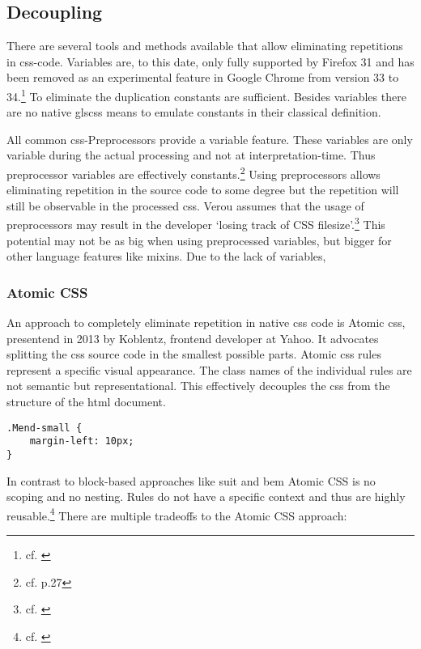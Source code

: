 \subsection{Decoupling}
There are several tools and methods available that allow eliminating repetitions in \gls{css}-code.
Variables are, to this date, only fully supported by Firefox 31 and has been removed as an experimental feature in Google Chrome from version 33 to 34.\footnote{cf. \cite{cssvariables}}
To eliminate the duplication constants are sufficient.
Besides variables there are no native gls{css} means to emulate constants in their classical definition.

All common \gls{css}-Preprocessors provide a variable feature.
These variables are only variable during the actual processing and not at interpretation-time.
Thus preprocessor variables are effectively constants.\footnote{cf. \cite{wirthpreprocessors} p.27}
Using preprocessors allows eliminating repetition in the source code to some degree
but the repetition will still be observable in the processed \gls{css}.
Verou assumes that the usage of preprocessors may result in the developer `losing track of CSS filesize'.\footnote{cf. \cite{veroupreprocessors}}
This potential may not be as big when using preprocessed variables, but bigger for other language features like mixins.
Due to the lack of variables, 

\subsubsection*{Atomic CSS}
An approach to completely eliminate repetition in native \gls{css} code is Atomic \gls{css}, presentend in 2013 by Koblentz, frontend developer at Yahoo.
It advocates splitting the \gls{css} source code in the smallest possible parts.
Atomic \gls{css} rules represent a specific visual appearance.
The class names of the individual rules are not semantic but representational.
This effectively decouples the \gls{css} from the structure of the \gls{html} document.


\begin{lstlisting}
.Mend-small {
    margin-left: 10px;
}
\end{lstlisting}

In contrast to block-based approaches like \gls{suit} and \gls{bem} Atomic CSS is no scoping and no nesting.
Rules do not have a specific context and thus are highly reusable.\footnote{cf. \cite{atomiccssarticle}}
There are multiple tradeoffs to the Atomic CSS approach:

